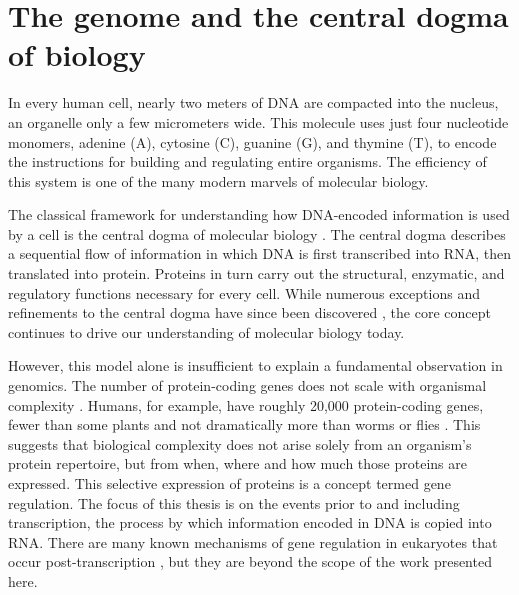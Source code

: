 \begin{dissertationintroduction}
    
\setcounter{chapter}{0}

\label{chap:introduction}

\section{The genome and the central dogma of biology}
In every human cell, nearly two meters of DNA are compacted into the nucleus, an organelle only a few micrometers wide. This molecule uses just four nucleotide monomers, adenine (A), cytosine (C), guanine (G), and thymine (T), to encode the instructions for building and regulating entire organisms. The efficiency of this system is one of the many modern marvels of molecular biology.

The classical framework for understanding how DNA-encoded information is used by a cell is the central dogma of molecular biology \cite{Crick1958-tb}. The central dogma describes a sequential flow of information in which DNA is first transcribed into RNA, then translated into protein. Proteins in turn carry out the structural, enzymatic, and regulatory functions necessary for every cell. While numerous exceptions and refinements to the central dogma have since been discovered \cite{UnknownUnknown-tl,Crick1970-lz}, the core concept continues to drive our understanding of molecular biology today.

However, this model alone is insufficient to explain a fundamental observation in genomics. The number of protein-coding genes does not scale with organismal complexity \cite{Levine2003-ra}. Humans, for example, have roughly 20,000 protein-coding genes, fewer than some plants \cite{Lian2024-mt} and not dramatically more than worms \cite{Hobert2013-gh} or flies \cite{Alberts2002-ib}. This suggests that biological complexity does not arise solely from an organism’s protein repertoire, but from when, where and how much those proteins are expressed. This selective expression of proteins is a concept termed gene regulation. The focus of this thesis is on the events prior to and including transcription, the process by which information encoded in DNA is copied into RNA. There are many known mechanisms of gene regulation in eukaryotes that occur post-transcription \cite{Zhao2017-hm,Keene2007-iy}, but they are beyond the scope of the work presented here.


\end{dissertationintroduction}
